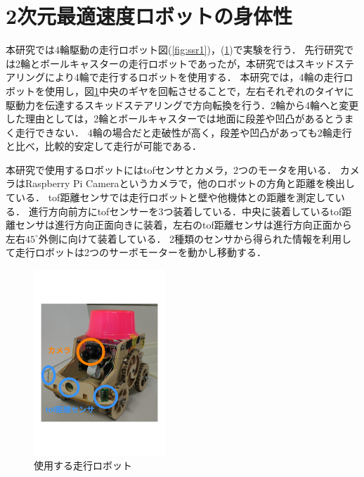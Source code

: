 \documentclass[twocolumn,dvipdfmx]{jarticle}
\begin{document}
\section{2次元最適速度ロボットの身体性}
本研究では4輪駆動の走行ロボット図(\ref{fig:ssr1})，(\ref{fig:ssr2})で実験を行う．
先行研究\cite{mygm}では2輪とボールキャスターの走行ロボットであったが，本研究ではスキッドステアリングにより4輪で走行するロボットを使用する．
本研究では，4輪の走行ロボットを使用し，図\ref{fig:ssr2}中央のギヤを回転させることで，左右それぞれのタイヤに駆動力を伝達するスキッドステアリングで方向転換を行う．2輪から4輪へと変更した理由としては，2輪とボールキャスターでは地面に段差や凹凸があるとうまく走行できない．
4輪の場合だと走破性が高く，段差や凹凸があっても2輪走行と比べ，比較的安定して走行が可能である．

本研究で使用するロボットにはtofセンサとカメラ，2つのモータを用いる．
カメラはRaspberry Pi Cameraというカメラで，他のロボットの方角と距離を検出している．
tof距離センサでは走行ロボットと壁や他機体との距離を測定している．
進行方向前方にtofセンサーを3つ装着している．中央に装着しているtof距離センサは進行方向正面向きに装着，左右のtof距離センサは進行方向正面から左右$45^{\circ}$外側に向けて装着している．
2種類のセンサから得られた情報を利用して走行ロボットは2つのサーボモーターを動かし移動する．
\newpage
\vspace{-2cm}
\begin{figure}[h]
\begin{center}
  \includegraphics[height=7cm,width=0.8\linewidth]{pic/robo.png}
  \vspace{-10mm}
  \caption{使用する走行ロボット}
  \label{fig:ssr2}
\end{center}
\end{figure}
\vspace{-3.5mm}
\end{document}
